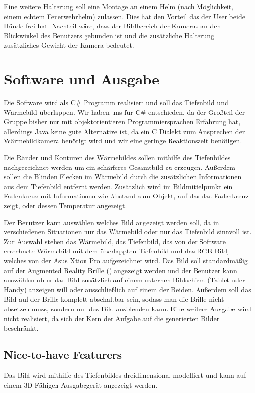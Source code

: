 Eine weitere Halterung soll eine Montage an einem Helm (nach Möglichkeit, einem echtem Feuerwehrhelm) zulassen.
Dies hat den Vorteil das der User beide Hände frei hat.
Nachteil wäre, dass der Bildbereich der Kameras an den Blickwinkel des Benutzers gebunden ist und die zusätzliche Halterung zusätzliches Gewicht der Kamera bedeutet.

\section{Software und Ausgabe}
Die Software wird als C\# Programm realisiert und soll das Tiefenbild und Wärmebild überlappen.
Wir haben uns für C\# entschieden, da der Großteil der Gruppe bisher nur mit objektorientieren Programmiersprachen Erfahrung hat, allerdings Java keine gute Alternative ist, da ein C Dialekt zum Ansprechen der Wärmebildkamera benötigt wird und wir eine geringe Reaktionszeit benötigen.

Die Ränder und Konturen des Wärmebildes sollen mithilfe des Tiefenbildes nachgezeichnet werden um ein schärferes Gesamtbild zu erzeugen.
Außerdem sollen die Blinden Flecken im Wärmebild durch die zusätzlichen Informationen aus dem Tiefenbild entfernt werden. Zusätzlich wird im Bildmittelpunkt ein Fadenkreuz mit Informationen wie Abstand zum Objekt, auf das das Fadenkreuz zeigt, oder dessen Temperatur angezeigt.

Der Benutzer kann auswählen welches Bild angezeigt werden soll, da in verschiedenen Situationen nur das Wärmebild oder nur das Tiefenbild sinnvoll ist.
Zur Auswahl stehen das Wärmebild, das Tiefenbild, das von der Software errechnete Wärmebild mit dem überlappten Tiefenbild und das RGB-Bild, welches von der Asus Xtion Pro aufgezeichnet wird.
Das Bild soll standardmäßig auf der Augmented Reality Brille (\meta) angezeigt werden und der Benutzer kann auswählen ob er das Bild zusätzlich auf einem externen Bildschirm (\zB Tablet oder Handy) anzeigen will oder ausschließlich auf einem der Beiden.
Außerdem soll das Bild auf der Brille komplett abschaltbar sein, sodass man die Brille nicht absetzen muss, sondern nur das Bild ausblenden kann.
Eine weitere Ausgabe wird nicht realisiert, da sich der Kern der Aufgabe  auf die generierten Bilder beschränkt. 

\subsection{Nice-to-have Featurers}
Das Bild wird mithilfe des Tiefenbildes dreidimensional modelliert und kann auf einem 3D-Fähigen Ausgabegerät angezeigt werden.


